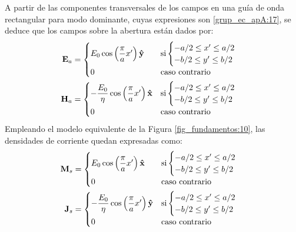 A partir de las componentes transversales de los campos en una guía de onda rectangular para modo dominante, cuyas expresiones son \eqref{grup_ec_apA:17}, se deduce que los campos sobre la abertura están dados por:
\begin{align}
\mathbf{E}_a &= 
\begin{cases}
\makebox[0pt][l]{$E_0\cos\left(\dfrac{\pi}{a}x'\right)\versor{y}$}\hphantom{-\dfrac{E_0}{\eta}\cos\left(\dfrac{\pi}{a}x'\right)\versor{x}} &\text{si}
\begin{cases} 
-a/2 \leq x' \leq a/2\\
-b/2 \leq y' \leq b/2
\end{cases}\\
0  &\text{caso contrario}
\end{cases}
\label{ec_apB:50}\\
\mathbf{H}_a &= 
\begin{cases} 
-\dfrac{E_0}{\eta}\cos\left(\dfrac{\pi}{a}x'\right)\versor{x} &\text{si}
\begin{cases} 
-a/2 \leq x' \leq a/2\\
-b/2 \leq y' \leq b/2
\end{cases}\\
0  & \text{caso contrario}
\end{cases}
\label{ec_apB:51}
\end{align}
Empleando el modelo equivalente de la Figura \ref{fig_fundamentos:10}, las densidades de corriente quedan expresadas como:
\begin{align}
\mathbf{M}_s &=
\begin{cases}
\makebox[0pt][l]{$E_0\cos\left(\dfrac{\pi}{a}x'\right)\versor{x}$}\hphantom{-\dfrac{E_0}{\eta}\cos\left(\dfrac{\pi}{a}x'\right)\versor{y}} &\text{si}
\begin{cases} 
-a/2 \leq x' \leq a/2\\
-b/2 \leq y' \leq b/2
\end{cases}\\
0 & \text{caso contrario}
\end{cases}
\label{ec_apB:52}\\
\mathbf{J}_s &= 
\begin{cases} 
-\dfrac{E_0}{\eta}\cos\left(\dfrac{\pi}{a}x'\right)\versor{y} &\text{si}
\begin{cases} 
-a/2 \leq x' \leq a/2\\
-b/2 \leq y' \leq b/2
\end{cases}\\
0  &\text{caso contrario}
\end{cases}
\label{ec_apB:53}
\end{align}
